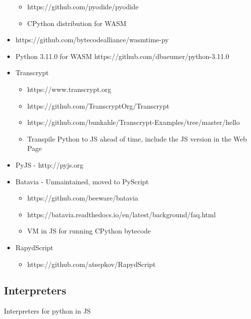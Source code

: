 \begin{itemize}
  \begin{itemize}
  \tightlist
  \item
    https://github.com/pyodide/pyodide
  \item
    CPython distribution for WASM
  \end{itemize}
\item
  https://github.com/bytecodealliance/wasmtime-py
\item
  Python 3.11.0 for WASM https://github.com/dbaeumer/python-3.11.0
\item
  Transcrypt

  \begin{itemize}
  \tightlist
  \item
    https://www.transcrypt.org
  \item
    https://github.com/TranscryptOrg/Transcrypt
  \item
    https://github.com/bunkahle/Transcrypt-Examples/tree/master/hello
  \item
    Transpile Python to JS ahead of time, include the JS version in the
    Web Page
  \end{itemize}
\item
  PyJS - http://pyjs.org
\item
  Batavia - Unmaintained, moved to PyScript

  \begin{itemize}
  \tightlist
  \item
    https://github.com/beeware/batavia
  \item
    https://batavia.readthedocs.io/en/latest/background/faq.html
  \item
    VM in JS for running CPython bytecode
  \end{itemize}
\item
  RapydScript

  \begin{itemize}
  \tightlist
  \item
    https://github.com/atsepkov/RapydScript
  \end{itemize}
\end{itemize}

\hypertarget{interpreters}{%
\subsection{Interpreters}\label{interpreters}}

Interpreters for python in JS

